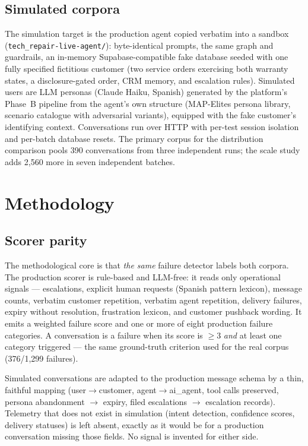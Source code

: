 \documentclass[11pt,a4paper]{article}
\begin{document}
\subsection{Simulated corpora}
The simulation target is the production agent copied verbatim into a sandbox
(\texttt{tech_repair-live-agent/}): byte-identical prompts, the same graph and guardrails, an
in-memory Supabase-compatible fake database seeded with one fully specified fictitious customer
(two service orders exercising both warranty states, a disclosure-gated order, CRM memory, and
escalation rules). Simulated users are LLM personas (Claude Haiku, Spanish) generated by the
platform's Phase~B pipeline from the agent's own structure (MAP-Elites persona library,
scenario catalogue with adversarial variants), equipped with the fake customer's identifying
context. Conversations run over HTTP with per-test session isolation and per-batch database
resets. The primary corpus for the distribution comparison pools 390 conversations from three
independent runs; the scale study adds 2{,}560 more in seven independent batches.

\section{Methodology}
\label{sec:method}

\subsection{Scorer parity}
The methodological core is that \emph{the same} failure detector labels both corpora.
The production scorer is rule-based and LLM-free: it reads only operational signals ---
escalations, explicit human requests (Spanish pattern lexicon), message counts, verbatim customer
repetition, verbatim agent repetition, delivery failures, expiry without resolution, frustration
lexicon, and customer pushback wording. It emits a weighted failure score and one or more of eight
production failure categories. A conversation is a failure when its score is $\geq 3$ \emph{and}
at least one category triggered --- the same ground-truth criterion used for the real corpus
(376/1{,}299 failures).

Simulated conversations are adapted to the production message schema by a thin, faithful mapping
(user$\to$customer, agent$\to$ai\_agent, tool calls preserved, persona abandonment $\to$ expiry,
filed escalations $\to$ escalation records). Telemetry that does not exist in simulation
(intent detection, confidence scores, delivery statuses) is left absent, exactly as it would be
for a production conversation missing those fields. No signal is invented for either side.
\end{document}
